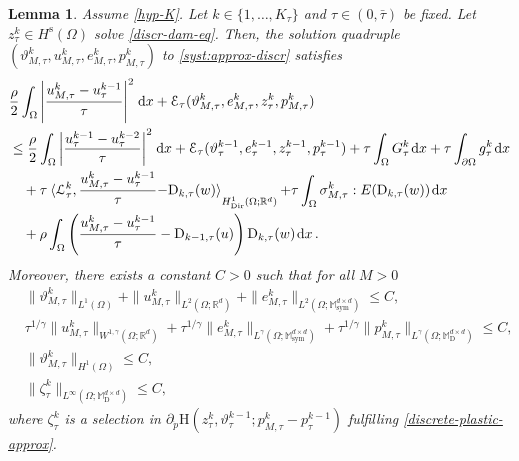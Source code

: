 \documentclass[a4paper,10pt,reqno]{amsart}
\numberwithin{equation}{section}
\newcommand{\bbM}{\mathbb{M}}
\newcommand{\R}{\mathbb{R}}
\numberwithin{equation}{section}
\newtheorem{lemma}[theorem]{Lemma}
\def\dd{\;\!\mathrm{d}} %
\newcommand{\pairing}[4]{ \sideset{_{ #1 }}{_{ #2 }}  {\mathop{\langle #3 , #4
\rangle}}}
\newcommand{\teta}{\vartheta}
\newcommand{\sig}[1]{E(#1)}
\newcommand{\Dir}{\mathrm{Dir}}
\newcommand{\mt}{\bbM}
\newcommand{\sym}{\mathrm{sym}}
\newcommand{\dev}{\mathrm{D}}
\newcommand{\dip}[3]{\mathrm{H}(#1,#2;#3)}
\newcommand{\spz}{H^{\mathrm{s}}(\Omega)}
\newcommand{\Ltau}[1]{\mathcal{L}_\tau^{#1}}
\newcommand{\Gtau}[1]{G_\tau^{#1}}
\newcommand{\gtau}[1]{g_\tau^{#1}}
\newcommand{\utau}[1]{u_\tau^{#1}}
\newcommand{\ptau}[1]{p_\tau^{#1}}
\newcommand{\ztau}[1]{z_\tau^{#1}}
\newcommand{\etau}[1]{e_\tau^{#1}}
\newcommand{\tetau}[1]{\teta_\tau^{#1}}
\newcommand{\simtau}[1]{\sigma_{M,\tau}^{#1}}
\newcommand{\Dtau}[2]{\mathrm{D}_{#1,\tau}(#2)}
\newcommand{\tetaum}[1]{\teta_{M,\tau}^{#1}}
\newcommand{\utaum}[1]{u_{M,\tau}^{#1}}
\newcommand{\ptaum}[1]{p_{M,\tau}^{#1}}
\newcommand{\etaum}[1]{e_{M,\tau}^{#1}}
\newcommand{\zetau}[1]{\zeta_{\tau}^{#1}}
\newcommand{\EEE}{\color{black}}
\newcommand{\MMM}{\color{black}}%
\begin{document}
\begin{lemma}
\label{l:aprio-M}
Assume \eqref{hyp-K}.
 Let $ k \in \{1,\ldots, K_\tau\} $ and $\tau \in (0,\bar \tau)$  be fixed.
Let $\ztau{k} \in \spz$ solve \eqref{discr-dam-eq}.
Then, the solution quadruple  $(\tetaum k, \utaum k, \etaum k,\ptaum k) $ to \eqref{syst:approx-discr} satisfies 
\begin{equation}
\label{discr-total-ineq}
\begin{aligned}
& \frac{\rho}2 \int_\Omega \left|\frac{\utaum k - \utau{k-1}}{\tau} \right|^2 \dd x + 
 \calE_\tau (\tetaum k,\etaum k, \ztau k, \ptaum k) \\  &  \leq  \frac{\rho}2 \int_\Omega \left| \frac{\utau{k-1} - \utau{k-2}}\tau \right |^2 \dd x +  \calE_\tau (\tetau {k-1},\etau {k-1},
 \ztau{k-1},
 \ptau{k-1})   
+ \tau \int_\Omega \Gtau k \dd x    + \tau \int_{\partial\Omega} \gtau{k} \dd x 
  \\ & \quad    + \tau \pairing{}{H_\Dir^{1}(\Omega;\R^d)}{\Ltau k}{\frac{\utaum k - \utau{k-1}}{\tau} {-} \Dtau kw}+ \tau \int_\Omega  \simtau {k} : \sig{\Dtau kw} \dd x   \\ & \quad  +\rho \int_\Omega \left(  \frac{\utaum k - \utau{k-1}}{\tau}  - \Dtau {k-1} u \right)   \Dtau kw \dd x\,.
\end{aligned}
\end{equation}
Moreover, there exists a constant $C>0$ such that  for all $M>0$
\begin{subequations}
\label{estimates-M-indep} 
\begin{align}
& 
\label{est-M-indep1}
\| \tetaum k\|_{L^1(\Omega)} + \| \utaum k \|_{L^2(\Omega;\R^d)} + \| \etaum k  \|_{L^2(\Omega;\mt_\sym^{d\times d})}  %
\leq C,
\\
& \label{est-M-indep2}
\tau^{1/\gamma}   \| \utaum k \|_{W^{1,\gamma} (\Omega;\R^d)} 
+  \tau^{1/\gamma}   \| \etaum k \|_{L^\gamma(\Omega;\mt_\sym^{d\times d})}
+  \tau^{1/\gamma}   \| \ptaum k \|_{L^\gamma(\Omega;\mt_\dev^{d\times d})}  \leq C, 
\\ & 
\label{est-M-indep3}
\| \tetaum k \|_{H^1(\Omega)}  %
 \leq C,
\\
& \label{est-M-indep4}
\| \zetau{k} \|_{L^\infty(\Omega;\mt_\dev^{d\times d})} \leq C,
\end{align}
\end{subequations}
where $\zetau k $ is a selection in $ \partial_{\dot p} \dip{\ztau k}{\tetau{k-1}}{\ptaum{k}{ -} \ptau{k-1}}$ fulfilling \eqref{discrete-plastic-approx}. 
\end{lemma}
\end{document}
